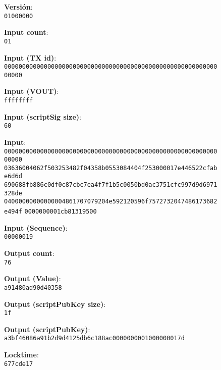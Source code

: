 \documentclass{article}
\begin{document}
\begin{figure}[H]
    \textbf{Versión}: \\
    \texttt{01000000}
    
    \textbf{Input count}: \\
    \texttt{01}
    
    \textbf{Input (TX id)}: \\
    \texttt{0000000000000000000000000000000000000000000000000000000000000000}
    
    \textbf{Input (VOUT)}: \\
    \texttt{ffffffff}
    
    \textbf{Input (scriptSig size)}: \\
    \texttt{60}
    
    \textbf{Input}: \\
    \texttt{0000000000000000000000000000000000000000000000000000000000000000}
    \texttt{03636004062f503253482f04358b0553084404f253000017e446522cfabe6d6d}
    \texttt{690688fb886c0df0c87cbc7ea4f7f1b5c0050bd0ac3751cfc997d9d6971328de}
    \texttt{04000000000000004861707079204e592120596f7572732047486173682e494f}
    \texttt{0000000001cb81319500}
    
    \textbf{Input (Sequence)}: \\
    \texttt{00000019}
    
    \textbf{Output count}: \\
    \texttt{76}
    
    \textbf{Output (Value)}: \\
    \texttt{a91480ad90d40358}
    
    \textbf{Output (scriptPubKey size)}: \\
    \texttt{1f}
    
    \textbf{Output (scriptPubKey)}: \\
    \texttt{a3bf46086a91b2d9d4125db6c188ac0000000001000000017d}
    
    \textbf{Locktime}: \\
    \texttt{677cde17}
\end{figure}
\end{document}
